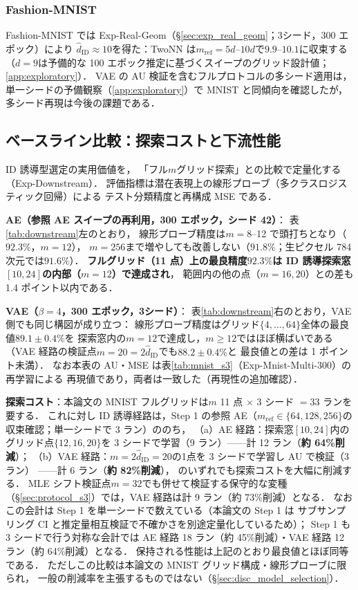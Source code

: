 \documentclass[11pt,a4paper]{jsarticle}
\newcommand{\hatdID}{\hat{d}_{\mathrm{ID}}}
\begin{document}
\subsubsection{Fashion-MNIST}

Fashion-MNIST では Exp-Real-Geom（§\ref{sec:exp_real_geom}；3シード，300 エポック）により
$\hatdID \approx 10$を得た：TwoNN は$m_{\mathrm{ref}} = 5d$--$10d$で$9.9$--$10.1$に収束する
（$d = 9$は予備的な 100 エポック推定に基づくスイープのグリッド設計値；\ref{app:exploratory}）．
VAE の AU 検証を含むフルプロトコルの多シード適用は，
単一シードの予備観察（\ref{app:exploratory}）で MNIST と同傾向を確認したが，
多シード再現は今後の課題である．

\subsection{ベースライン比較：探索コストと下流性能}\label{sec:exp_downstream}

ID 誘導型選定の実用価値を，
「フル$m$グリッド探索」との比較で定量化する（Exp-Downstream）．
評価指標は潜在表現上の線形プローブ（多クラスロジスティック回帰）による
テスト分類精度と再構成 MSE である．

\textbf{AE（参照 AE スイープの再利用，300 エポック，シード 42）}：
表\ref{tab:downstream}左のとおり，
線形プローブ精度は$m = 8$--12 で頭打ちとなり（$92.3\%$，$m = 12$），
$m = 256$まで増やしても改善しない（$91.8\%$；生ピクセル 784 次元では$91.6\%$）．
\textbf{フルグリッド（11 点）上の最良精度$92.3\%$は
ID 誘導探索窓$[10, 24]$の内部（$m = 12$）で達成され}，
範囲内の他の点（$m = 16, 20$）との差も 1.4 ポイント以内である．

\textbf{VAE（$\beta = 4$，300 エポック，3シード）}：
表\ref{tab:downstream}右のとおり，VAE 側でも同じ構図が成り立つ：
線形プローブ精度はグリッド$\{4, \ldots, 64\}$全体の最良値$89.1 \pm 0.4\%$を
探索窓内の$m = 12$で達成し，$m \geq 12$ではほぼ横ばいである
（VAE 経路の検証点$m = 20 = 2\hatdID$でも$88.2 \pm 0.4\%$と
最良値との差は 1 ポイント未満）．
なお本表の AU・MSE は表\ref{tab:mnist_s3}（Exp-Mnist-Multi-300）の再学習による
再現値であり，両者は一致した（再現性の追加確認）．

\textbf{探索コスト}：本論文の MNIST フルグリッドは$m$ 11 点
$\times$ 3 シード $= 33$ ランを要する．
これに対し ID 誘導経路は，Step 1 の参照 AE（$m_{\mathrm{ref}} \in \{64, 128, 256\}$の
収束確認；単一シードで 3 ラン）ののち，
（a）AE 経路：探索窓$[10, 24]$内のグリッド点$\{12, 16, 20\}$を
3 シードで学習（9 ラン）——計 12 ラン（\textbf{約 64\%削減}）；
（b）VAE 経路：$m = 2\hatdID = 20$の1点を 3 シードで学習し AU で検証（3 ラン）
——計 6 ラン（\textbf{約 82\%削減}），
のいずれでも探索コストを大幅に削減する．
MLE シフト検証点$m = 32$でも併せて検証する保守的な変種
（§\ref{sec:protocol_s3}）では，VAE 経路は計 9 ラン（約 73\%削減）となる．
なおこの会計は Step 1 を単一シードで数えている（本論文の Step 1 は
サブサンプリング CI と推定量相互検証で不確かさを別途定量化しているため）；
Step 1 も 3 シードで行う対称な会計では
AE 経路 18 ラン（約 45\%削減）・VAE 経路 12 ラン（約 64\%削減）となる．
保持される性能は上記のとおり最良値とほぼ同等である．
ただしこの比較は本論文の MNIST グリッド構成・線形プローブに限られ，
一般の削減率を主張するものではない（§\ref{sec:disc_model_selection}）．
\end{document}
